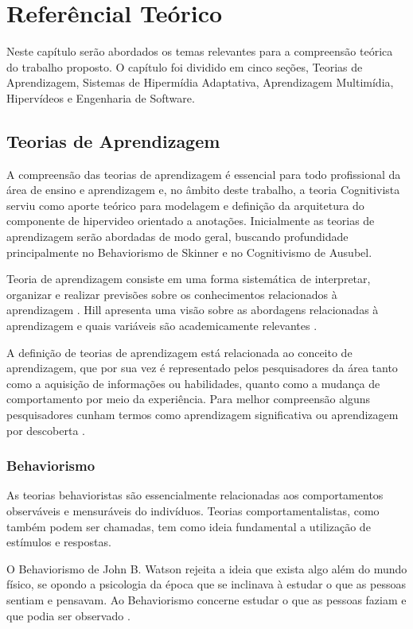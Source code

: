 \chapter[Referêncial Teórico]{Referêncial Teórico}

Neste capítulo serão abordados os temas relevantes para a compreensão teórica do trabalho proposto. O capítulo foi dividido em cinco seções, Teorias de Aprendizagem, Sistemas de Hipermídia Adaptativa, Aprendizagem Multimídia, Hipervídeos e Engenharia de Software.

\section{Teorias de Aprendizagem}

A compreensão das teorias de aprendizagem é essencial para todo profissional da área de ensino e aprendizagem e, no âmbito deste trabalho, a teoria Cognitivista serviu como aporte teórico para modelagem e definição da arquitetura do componente de hipervideo orientado a anotações. Inicialmente as teorias de aprendizagem serão abordadas de modo geral, buscando profundidade principalmente no Behaviorismo de Skinner e no Cognitivismo de Ausubel.

Teoria de aprendizagem consiste em uma forma sistemática de interpretar, organizar e realizar previsões sobre os conhecimentos relacionados à aprendizagem \cite{moreira1999}. Hill apresenta uma visão sobre as abordagens relacionadas à aprendizagem e quais variáveis são academicamente relevantes \cite{hill2002}.

A definição de teorias de aprendizagem está relacionada ao conceito de aprendizagem, que por sua vez é representado pelos pesquisadores da área tanto como a aquisição de informações ou habilidades, quanto como a mudança de comportamento por meio da experiência. Para melhor compreensão alguns pesquisadores cunham termos como aprendizagem significativa ou aprendizagem por descoberta \cite{fragelli2010}.

\subsection{Behaviorismo}

As teorias behavioristas são essencialmente relacionadas aos comportamentos observáveis e mensuráveis do indivíduos. Teorias comportamentalistas, como também podem ser chamadas, tem como ideia fundamental a utilização de estímulos e respostas.

O Behaviorismo de John B. Watson rejeita a ideia que exista algo além do mundo físico, se opondo a psicologia da época que se inclinava à estudar o que as pessoas sentiam e pensavam. Ao Behaviorismo concerne estudar o que as pessoas faziam e que podia ser observado \cite{moreira1999}.

